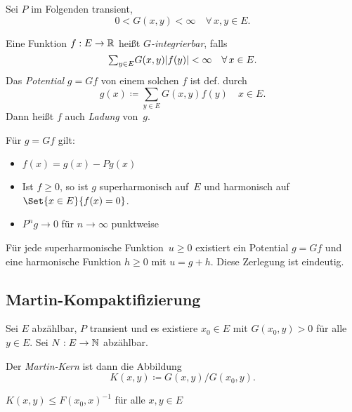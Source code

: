 \documentclass{cheat-sheet}
\begin{document}
Sei $P$ im Folgenden transient, \dh{}
\[
  0 < G(x, y) < \infty \quad
  \forall \, x, y \in E.
\]

\begin{defn}
  Eine Funktion $f : E \to \mathbb{R}$ heißt \emph{$G$-integrierbar}, falls
  \[
    {\sum}_{y \in E} G(x, y) \abs{f(y)} < \infty \quad
    \forall \, x \in E.
  \]
  Das \emph{Potential} $g = Gf$ von einem solchen $f$ ist def. durch
  \[
    g(x) \coloneqq {\sum}_{y \in E} G(x, y) f(y) \quad x \in E.
  \]
  Dann heißt $f$ auch \emph{Ladung} von~$g$.
\end{defn}

\begin{lem}
  Für $g = G f$ gilt:
  \begin{itemize}
    \item $f(x) = g(x) - P g(x)$
    \item Ist $f \geq 0$, so ist $g$ superharmonisch auf~$E$ und harmonisch auf $\Set{x \in E}{f(x) = 0}$.
    \item $P^n g \to 0$ für $n \to \infty$ punktweise
  \end{itemize}
\end{lem}

\begin{satz}
  Für jede superharmonische Funktion~$u \geq 0$ existiert ein Potential $g = G f$ und eine harmonische Funktion $h \geq 0$ mit $u = g + h$.
  Diese Zerlegung ist eindeutig.
\end{satz}

\subsection{Martin-Kompaktifizierung}


\begin{situation}
  Sei $E$ abzählbar, $P$ transient und es existiere $x_0 \in E$ mit $G(x_0, y) > 0$ für alle $y \in E$.
  Sei $N : E \to \mathbb{N}$ abzählbar.
\end{situation}

\begin{defn}
  Der \emph{Martin-Kern} ist dann die Abbildung
  \[
    K(x, y) \coloneqq G(x, y) / G(x_0, y).
  \]
\end{defn}

\begin{lem}
  $K(x, y) \leq F(x_0, x)^{-1}$ für alle $x, y \in E$
\end{lem}
\end{document}
